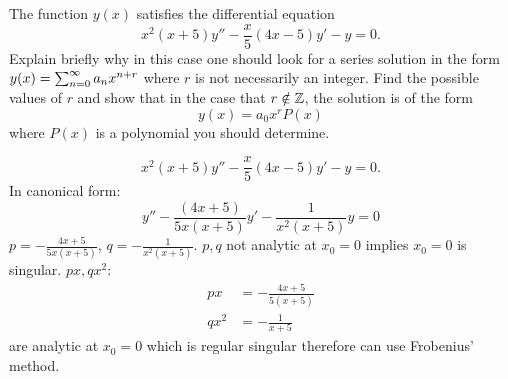 \documentclass[10pt, a4paper]{article}
\begin{document}
\begin{problem}[Resit $2021$]
    The function $y(x)$ satisfies the differential equation
    \[
    x ^ 2(x + 5)y'' - \frac{x}{5}(4x - 5)y' - y = 0.
    \]
    Explain briefly why in this case one should look for a series solution in the form $y(x) = \infsum[n = 0]a_nx ^ {n + r}$ where $r$ is not necessarily an integer.
    Find the possible values of $r$ and show that in the case that $r \notin \Z$,
    the solution is of the form
    \[
    y(x) = a_0x ^ rP(x)
    \]
    where $P(x)$ is a polynomial you should determine.

    \begin{solution}
        \[
        x ^ 2(x + 5)y'' - \frac{x}{5}(4x - 5)y' - y = 0.
        \]
        In canonical form:
        \[
        y'' - \frac{(4x + 5)}{5x(x + 5)}y' - \frac{1}{x ^ 2(x + 5)}y = 0
        \]
        $p = -\frac{4x + 5}{5x(x + 5)}$,
        $q = -\frac{1}{x ^ 2(x + 5)}$.
        $p, q$ not analytic at $x_0 = 0$ implies $x_0 = 0$ is singular.
        $px, qx ^ 2$:
        \begin{align*}
            px &= -\frac{4x + 5}{5(x + 5)} \\
            qx ^ 2 &= -\frac{1}{x + 5}
        \end{align*}
        are analytic at $x_0 = 0$ which is regular singular therefore can use Frobenius' method.


\end{solution}
\end{problem}
\end{document}
